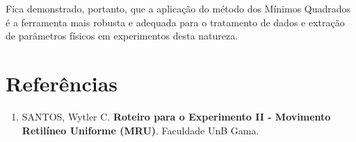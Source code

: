 \documentclass[12pt, a4paper]{article}
\begin{document}
Fica demonstrado, portanto, que a aplicação do método dos Mínimos Quadrados é a ferramenta mais robusta e adequada para o tratamento de dados e extração de parâmetros físicos em experimentos desta natureza.

\section*{Referências}
\begin{enumerate}
    \item SANTOS, Wytler C. \textbf{Roteiro para o Experimento II - Movimento Retilíneo Uniforme (MRU)}. Faculdade UnB Gama.
\end{enumerate}
\end{document}
